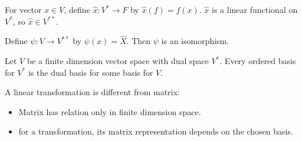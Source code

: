 \begin{definition}
    For vector $x \in V$, define $\hat{x}: V^* \rightarrow F $ by $\hat{x}(f) = f(x)$. $\hat{x}$ is a linear functional on $V^*$, so $\hat{x} \in V^{**}$.
\end{definition}


\begin{theorem}
    Define $\psi : V \rightarrow V^{**}$ by $\psi (x) = \hat{X}$.  Then $\psi$ is an isomorphism.
\end{theorem}

\begin{theorem}
    Let $V$ be a finite dimension vector space with dual space $V^*$. Every ordered basis for $V^*$ is the dual basis for some basis for $V$.
\end{theorem}

\begin{center}
\end{center}



A linear transformation is different from matrix:
\begin{itemize}
    \item Matrix has relation only in finite dimension space.
    \item for a transformation, its matrix representation depends on the chosen basis.
\end{itemize}



